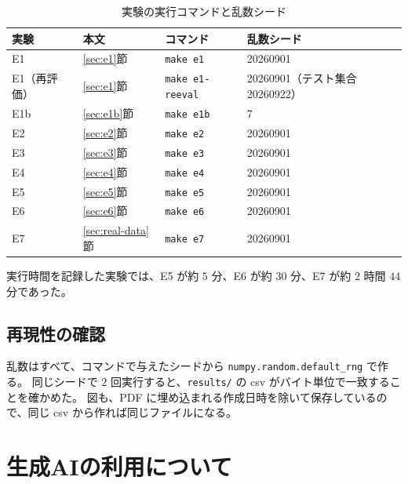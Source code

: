 \documentclass[a4paper,11pt]{jsarticle}
\theoremstyle{definition}
\theoremstyle{plain}
\theoremstyle{remark}
\begin{document}
\begin{table}[htbp]
  \centering
  \caption{実験の実行コマンドと乱数シード}
  \label{tab:reproduce}
  \begin{tabular}{llll}
    \toprule
    実験 & 本文 & コマンド & 乱数シード \\
    \midrule
    E1 & \ref{sec:e1}節 & \texttt{make e1} & 20260901 \\
    E1（再評価） & \ref{sec:e1}節 & \texttt{make e1-reeval} & 20260901（テスト集合 20260922） \\
    E1b & \ref{sec:e1b}節 & \texttt{make e1b} & 7 \\
    E2 & \ref{sec:e2}節 & \texttt{make e2} & 20260901 \\
    E3 & \ref{sec:e3}節 & \texttt{make e3} & 20260901 \\
    E4 & \ref{sec:e4}節 & \texttt{make e4} & 20260901 \\
    E5 & \ref{sec:e5}節 & \texttt{make e5} & 20260901 \\
    E6 & \ref{sec:e6}節 & \texttt{make e6} & 20260901 \\
    E7 & \ref{sec:real-data}節 & \texttt{make e7} & 20260901 \\
    \bottomrule
  \end{tabular}
\end{table}

実行時間を記録した実験では、E5 が約 $5$ 分、E6 が約 $30$ 分、E7 が約 $2$ 時間 $44$ 分であった。

\subsection{再現性の確認}

乱数はすべて、コマンドで与えたシードから \texttt{numpy.random.default\_rng} で作る。
同じシードで $2$ 回実行すると、\texttt{results/} の csv がバイト単位で一致することを確かめた。
図も、PDF に埋め込まれる作成日時を除いて保存しているので、同じ csv から作れば同じファイルになる。

\section{生成AIの利用について}

\nocite{*}

\end{document}
